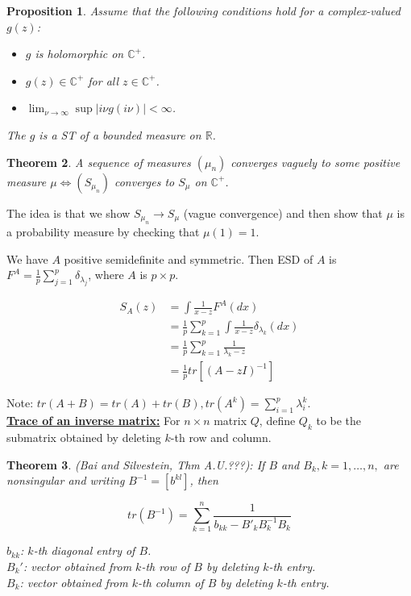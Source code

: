 \documentclass[twoside]{article}
\newcounter{lecnum}
\newtheorem{theorem}{Theorem}[lecnum]
\newtheorem{proposition}[theorem]{Proposition}
\begin{document}
\begin{proposition}
	Assume that the following conditions hold for a complex-valued $g(z)$:
	
	\begin{itemize}
		\item $g$ is holomorphic on $\mathbb{C}^+$.
		\item $g(z)\in\mathbb{C}^+$ for all $z\in\mathbb{C}^+$.
		\item $\lim_{\nu\to\infty}\sup\lvert i\nu g(i\nu)\rvert<\infty$.
	\end{itemize}
	
	The $g$ is a ST of a bounded measure on $\mathbb{R}$.
\end{proposition}

\begin{theorem}
	A sequence of measures $(\mu_n)$ converges vaguely to some positive measure $\mu\iff (S_{\mu_n})$ converges to $S_\mu$ on $\mathbb{C}^+$.
\end{theorem}

The idea is that we show $S_{\mu_n}\to S_\mu$ (vague convergence) and then show that $\mu$ is a probability measure by checking that $\mu(1)=1$.

We have $A$ positive semidefinite and symmetric. Then ESD of $A$ is $F^A=\frac{1}{p}\sum^p_{j=1}\delta_{\lambda_j}$, where $A$ is $p\times p$.

\begin{equation}
	\begin{split}
		S_A(z)&=\int\frac{1}{x-z}F^A(dx)\\
		&=\frac{1}{p}\sum^p_{k=1}\int\frac{1}{x-z}\delta_{\lambda_k}(dx)\\
		&=\frac{1}{p}\sum^p_{k=1}\frac{1}{\lambda_k-z}\\
		&=\frac{1}{p}tr[(A-zI)^{-1}]
	\end{split}
\end{equation}

Note: $tr(A+B)=tr(A)+tr(B), tr(A^k)=\sum^p_{i=1}\lambda_i^k.$\\

\underline{\textbf{Trace of an inverse matrix:}} For $n\times n$ matrix $Q$, define $Q_k$ to be the submatrix obtained by deleting $k$-th row and column.

\begin{theorem}
	(Bai and Silvestein, Thm A.U.???): If $B$ and $B_k, k=1,\dots, n,$ are nonsingular and writing $B^{-1}=[b^{kl}]$, then
	
	$$tr(B^{-1})=\sum^n_{k=1}\frac{1}{b_{kk}-B'_kB^{-1}_kB_k}$$
	
	$b_{kk}$: $k$-th diagonal entry of $B$.\\
	$B_k'$: vector obtained from $k$-th row of $B$ by deleting $k$-th entry.\\
	$B_k$: vector obtained from $k$-th column of $B$ by deleting $k$-th entry.
\end{theorem}
\end{document}

